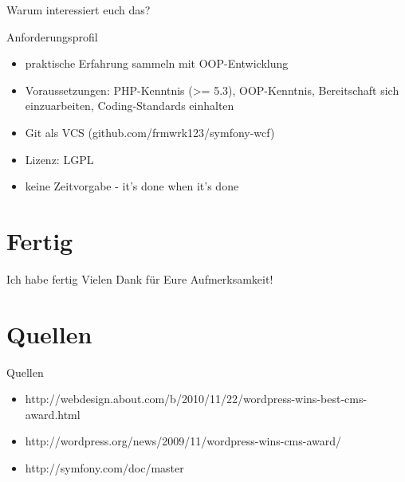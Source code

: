\documentclass{beamer}
\begin{document}
\begin{frame}
	\centering
	Warum interessiert euch das?
\end{frame}

\begin{frame}{Anforderungsprofil}
	\begin{itemize}
		\item	praktische Erfahrung sammeln mit OOP-Entwicklung
		\item	Voraussetzungen: PHP-Kenntnis (>= 5.3), OOP-Kenntnis, Bereitschaft sich einzuarbeiten, Coding-Standards einhalten
		\item	Git als VCS (github.com/frmwrk123/symfony-wcf)
		\item	Lizenz: LGPL
		\item	keine Zeitvorgabe - it's done when it's done
	\end{itemize}
\end{frame}

\section{Fertig}
\begin{frame}{Ich habe fertig}
	\centering
	Vielen Dank für Eure Aufmerksamkeit!
\end{frame}


\section{Quellen}
\begin{frame}{Quellen}
	\begin{itemize}	
		\item	http://webdesign.about.com/b/2010/11/22/wordpress-wins-best-cms-award.html
		\item	http://wordpress.org/news/2009/11/wordpress-wins-cms-award/
		\item	http://symfony.com/doc/master
	\end{itemize}
\end{frame}
\end{document}

